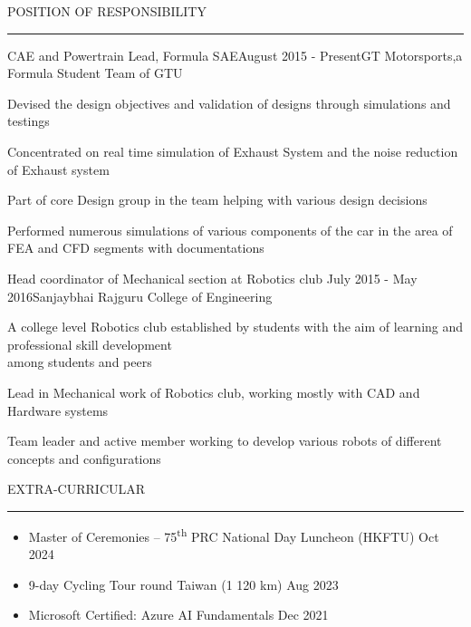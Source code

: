 \documentclass{resume} %
\renewenvironment{rSection}[1]{
\sectionskip
\textcolor{TsinghuaPurple}{\MakeUppercase{#1}}
\sectionlineskip
\hrule
\begin{list}{}{
\setlength{\leftmargin}{0em}
}
\item[]
}{
\end{list}
}
\begin{document}

\begin{rSection}{POSITION OF RESPONSIBILITY}

\begin{rSubsection}{CAE and Powertrain Lead, Formula SAE}{August 2015 - Present}{GT Motorsports,a Formula Student Team of GTU}{}              
\item Devised the design objectives and validation of designs through simulations and testings
\item Concentrated on real time simulation of Exhaust System and the noise reduction of Exhaust system
\item Part of core Design group in the team helping with various design decisions  
\item Performed numerous simulations of various components of the car in the area of FEA and CFD segments with documentations   
\end{rSubsection}  


\begin{rSubsection}{Head coordinator of Mechanical section at Robotics club} {July 2015 - May 2016}{Sanjaybhai Rajguru College of Engineering}{} 
\item A college level Robotics club established by students with the aim of learning and professional skill development \\among students and peers            
\item Lead in Mechanical work of Robotics club, working mostly with CAD and Hardware systems
\item Team leader and active member working to develop various robots of different concepts and configurations     
\end{rSubsection}

\end{rSection}




\begin{rSection}{Extra-Curricular} \itemsep -2pt

\begin{itemize}
\item Master of Ceremonies – 75\textsuperscript{th} PRC National Day Luncheon (HKFTU) \hfill Oct 2024
\item 9-day Cycling Tour round Taiwan (1 120 km) \hfill Aug 2023
\item Microsoft Certified: Azure AI Fundamentals \hfill Dec 2021
\end{itemize}

\end{rSection}
\end{document}
